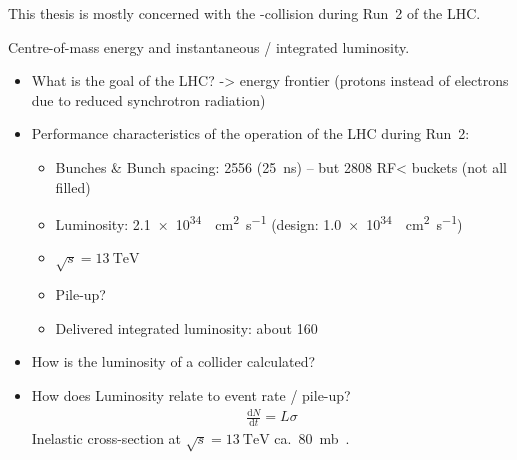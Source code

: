 This thesis is mostly concerned with the \pp-collision during Run~2 of the LHC.


Centre-of-mass energy and instantaneous / integrated luminosity.



\begin{itemize}

\item What is the goal of the LHC? -> energy frontier (protons instead of
  electrons due to reduced synchrotron radiation)

\item Performance characteristics of the \pp operation of the LHC during Run~2:

  \begin{itemize}
  \item Bunches \& Bunch spacing: 2556 (\SI{25}{\nano\second}) -- but 2808 RF<
    buckets (not all filled)
  \item Luminosity: \SI{2.1e34}{\per\centi\metre\squared\per\second} (design:
    \SI{1.0e34}{\per\centi\metre\squared\per\second})
  \item $\sqrt{s} = \SI{13}{\TeV}$
  \item Pile-up?
  \item Delivered integrated luminosity: about \SI{160}{\ifb}
    \end{itemize}

\item How is the luminosity of a collider calculated?

\item How does Luminosity relate to event rate / pile-up?
  \begin{align*}
    \frac{\mathrm{d}N}{\mathrm{d}t} = L \sigma
  \end{align*}
  Inelastic \pp cross-section at $\sqrt{s} = \SI{13}{\TeV}$ ca.\
  \SI{80}{\milli\barn}~\cite{STDM-2015-05}.

\end{itemize}


